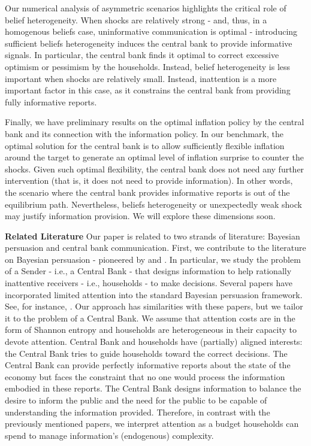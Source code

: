 \documentclass[12pt,a4paper]{article}
\begin{document}
Our numerical analysis of asymmetric scenarios highlights the critical role of belief heterogeneity. When shocks are relatively strong - and, thus, in a homogenous beliefs case, uninformative communication is optimal - introducing sufficient beliefs heterogeneity induces the central bank to provide informative signals. In particular, the central bank finds it optimal to correct excessive optimism or pessimism by the households. Instead, belief heterogeneity is less important when shocks are relatively small. Instead, inattention is a more important factor in this case, as it constrains the central bank from providing fully informative reports.

Finally, we have preliminary results on the optimal inflation policy by the central bank and its connection with the information policy. In our benchmark, the optimal solution for the central bank is to allow sufficiently flexible inflation around the target to generate an optimal level of inflation surprise to counter the shocks. Given such optimal flexibility, the central bank does not need any further intervention (that is, it does not need to provide information). In other words, the scenario where the central bank provides informative reports is out of the equilibrium path. Nevertheless, beliefs heterogeneity or unexpectedly weak shock may justify information provision. We will explore these dimensions soon.

\noindent\textbf{Related Literature} Our paper is related to two strands of literature: Bayesian persuasion and central bank communication. First, we contribute to the literature on Bayesian persuasion - pioneered by \cite{aumann1995repeated} and \cite{KG2011}. In particular, we study the problem of a Sender - i.e., a Central Bank - that designs information to help rationally inattentive \citep{Sims2003} receivers - i.e., households - to make decisions. Several papers have incorporated limited attention into the standard Bayesian persuasion framework. See, for instance, \cite{Bloedel2020,Lipnowski2020,lipnowski2022,Wei2021,Matyskova2021,innocenti2022can}. Our approach has similarities with these papers, but we tailor it to the problem of a Central Bank. We assume that attention costs are in the form of Shannon entropy and households are heterogeneous in their capacity to devote attention. Central Bank and households have (partially) aligned interests: the Central Bank tries to guide households toward the correct decisions. The Central Bank can provide perfectly informative reports about the state of the economy but faces the constraint that no one would process the information embodied in these reports. The Central Bank designs information to balance the desire to inform the public and the need for the public to be capable of understanding the information provided. Therefore, in contrast with the previously mentioned papers, we interpret attention as a budget households can spend to manage information's (endogenous) complexity.
\end{document}
